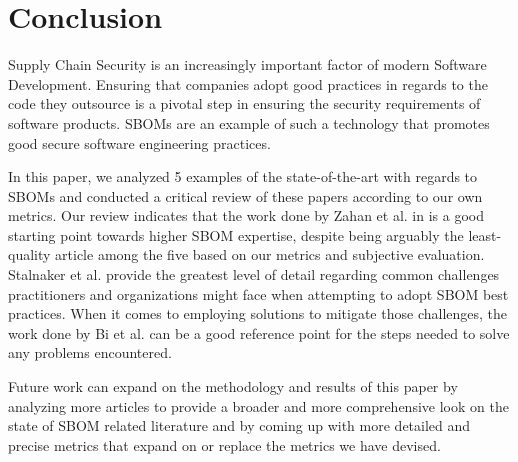 \section{Conclusion}

Supply Chain Security is an increasingly important factor of modern Software Development. Ensuring that companies adopt good practices in regards to the code they outsource is a pivotal step in ensuring the security requirements of software products. SBOMs \cite{article:concept:sbom-2} are an example of such a technology that promotes good secure software engineering practices.

In this paper, we analyzed 5 examples of the state-of-the-art with regards to SBOMs and conducted a critical review of these papers according to our own metrics. Our review indicates that the work done by Zahan et al. in \cite{article:sbom-required} is a good starting point towards higher SBOM expertise, despite being arguably the least-quality article among the five based on our metrics and subjective evaluation. Stalnaker et al. \cite{article:software-bom} provide the greatest level of detail regarding common challenges practitioners and organizations might face when attempting to adopt SBOM best practices. When it comes to employing solutions to mitigate those challenges, the work done by Bi et al. \cite{article:sboms-issues-solutions} can be a good reference point for the steps needed to solve any problems encountered.

Future work can expand on the methodology and results of this paper by analyzing more articles to provide a broader and more comprehensive look on the state of SBOM related literature and by coming up with more detailed and precise metrics that expand on or replace the metrics we have devised.